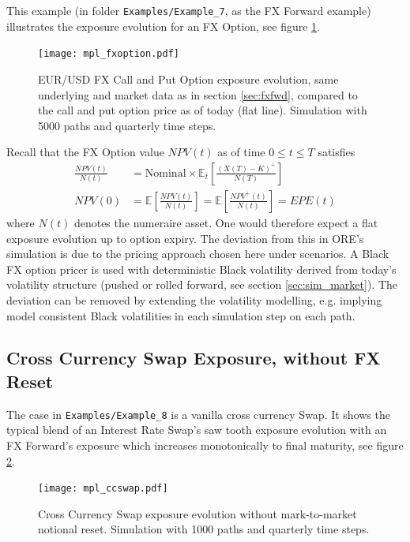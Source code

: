 \documentclass[12pt, a4paper]{article}
\newcommand\E{\ensuremath{\mathbb{E}}}
\newcommand{\EPE}{\mathit{EPE}}
\begin{document}
This example (in folder {\tt Examples/Example\_7}, as the FX Forward example) illustrates the exposure evolution for an
FX Option, see figure \ref{fig_7}.
\begin{figure}[h!]
\begin{center}
\texttt{[image: mpl\_fxoption.pdf]}
\end{center}
\caption{EUR/USD FX Call and Put Option exposure evolution, same underlying and market data as in section
  \ref{sec:fxfwd}, compared to the call and put option price as of today (flat line). Simulation with 5000 paths and
  quarterly time steps.}
\label{fig_7}
\end{figure}
Recall that the FX Option value $NPV(t)$ as of time $0 \leq t \leq T$ satisfies
\begin{align*}
\frac{NPV(t)}{N(t)} &= \mbox{Nominal}\times\E_t\left[\frac{(X(T) - K)^+}{N(T)}\right]\\
NPV(0) &= \E\left[\frac{NPV(t)}{N(t)}\right] = \E\left[\frac{NPV^+(t)}{N(t)} \right]= \EPE(t) 
\end{align*}
where $N(t)$ denotes the numeraire asset.
One would therefore expect a flat exposure evolution up to option expiry. The deviation from this in ORE's simulation is
due to the pricing approach chosen here under scenarios. A Black FX option pricer is used with deterministic Black
volatility derived from today's volatility structure (pushed or rolled forward, see section \ref{sec:sim_market}). The
deviation can be removed by extending the volatility modelling, e.g. implying model consistent Black volatilities in
each simulation step on each path.  

\subsection{Cross Currency Swap Exposure, without FX Reset}

The case in {\tt Examples/Example\_8} is a vanilla cross currency Swap. It shows the typical blend of an Interest Rate
Swap's saw tooth exposure evolution with an FX Forward's exposure which increases monotonically to final maturity, see
figure \ref{fig_6}.
\begin{figure}[h!]
\begin{center}
\texttt{[image: mpl\_ccswap.pdf]}
\end{center}
\caption{Cross Currency Swap exposure evolution without mark-to-market notional reset. Simulation with 1000 paths and
  quarterly time steps.}
\label{fig_6}
\end{figure}
\end{document}

